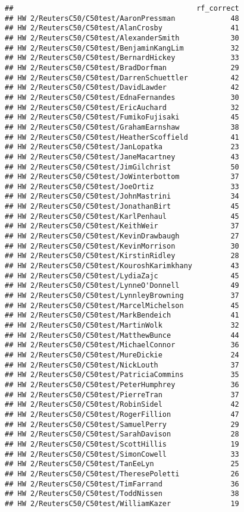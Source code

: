 \documentclass[]{article}
\begin{document}
\begin{verbatim}
##                                           rf_correct
## HW 2/ReutersC50/C50test/AaronPressman             48
## HW 2/ReutersC50/C50test/AlanCrosby                41
## HW 2/ReutersC50/C50test/AlexanderSmith            30
## HW 2/ReutersC50/C50test/BenjaminKangLim           32
## HW 2/ReutersC50/C50test/BernardHickey             33
## HW 2/ReutersC50/C50test/BradDorfman               29
## HW 2/ReutersC50/C50test/DarrenSchuettler          42
## HW 2/ReutersC50/C50test/DavidLawder               42
## HW 2/ReutersC50/C50test/EdnaFernandes             30
## HW 2/ReutersC50/C50test/EricAuchard               32
## HW 2/ReutersC50/C50test/FumikoFujisaki            45
## HW 2/ReutersC50/C50test/GrahamEarnshaw            38
## HW 2/ReutersC50/C50test/HeatherScoffield          41
## HW 2/ReutersC50/C50test/JanLopatka                23
## HW 2/ReutersC50/C50test/JaneMacartney             43
## HW 2/ReutersC50/C50test/JimGilchrist              50
## HW 2/ReutersC50/C50test/JoWinterbottom            37
## HW 2/ReutersC50/C50test/JoeOrtiz                  33
## HW 2/ReutersC50/C50test/JohnMastrini              34
## HW 2/ReutersC50/C50test/JonathanBirt              45
## HW 2/ReutersC50/C50test/KarlPenhaul               45
## HW 2/ReutersC50/C50test/KeithWeir                 37
## HW 2/ReutersC50/C50test/KevinDrawbaugh            27
## HW 2/ReutersC50/C50test/KevinMorrison             30
## HW 2/ReutersC50/C50test/KirstinRidley             28
## HW 2/ReutersC50/C50test/KouroshKarimkhany         43
## HW 2/ReutersC50/C50test/LydiaZajc                 45
## HW 2/ReutersC50/C50test/LynneO'Donnell            49
## HW 2/ReutersC50/C50test/LynnleyBrowning           37
## HW 2/ReutersC50/C50test/MarcelMichelson           45
## HW 2/ReutersC50/C50test/MarkBendeich              41
## HW 2/ReutersC50/C50test/MartinWolk                32
## HW 2/ReutersC50/C50test/MatthewBunce              44
## HW 2/ReutersC50/C50test/MichaelConnor             36
## HW 2/ReutersC50/C50test/MureDickie                24
## HW 2/ReutersC50/C50test/NickLouth                 37
## HW 2/ReutersC50/C50test/PatriciaCommins           35
## HW 2/ReutersC50/C50test/PeterHumphrey             36
## HW 2/ReutersC50/C50test/PierreTran                37
## HW 2/ReutersC50/C50test/RobinSidel                42
## HW 2/ReutersC50/C50test/RogerFillion              47
## HW 2/ReutersC50/C50test/SamuelPerry               29
## HW 2/ReutersC50/C50test/SarahDavison              28
## HW 2/ReutersC50/C50test/ScottHillis               19
## HW 2/ReutersC50/C50test/SimonCowell               33
## HW 2/ReutersC50/C50test/TanEeLyn                  25
## HW 2/ReutersC50/C50test/TheresePoletti            26
## HW 2/ReutersC50/C50test/TimFarrand                36
## HW 2/ReutersC50/C50test/ToddNissen                38
## HW 2/ReutersC50/C50test/WilliamKazer              19
\end{verbatim}
\end{document}

